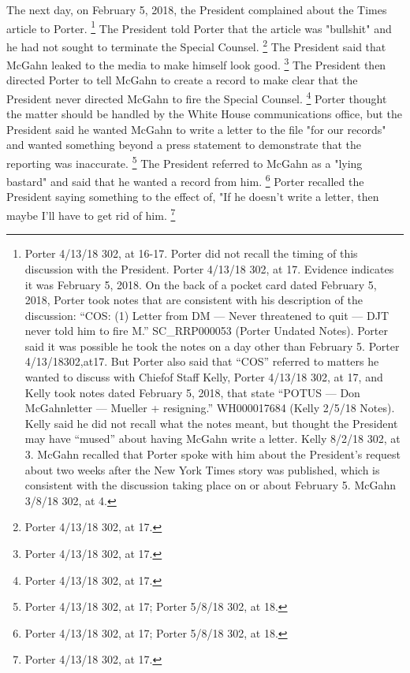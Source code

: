 {The next day, on February 5, 2018, the President complained about the Times article to Porter.%
\footnote{Porter 4/13/18 302, at 16-17.
Porter did not recall the timing of this discussion with the President.
Porter 4/13/18 302, at 17.
Evidence indicates it was February 5, 2018.
On the back of a pocket card dated February 5, 2018, Porter took notes that are consistent with his description of the discussion: “COS: (1) Letter from DM — Never threatened to quit — DJT never told him to fire M.”
SC\_RRP000053 (Porter Undated Notes).
Porter said it was possible he took the notes on a day other than February 5.
Porter 4/13/18302,at17.
But Porter also said that “COS” referred to matters he wanted to discuss with Chiefof Staff Kelly, Porter 4/13/18 302, at 17, and Kelly took notes dated February 5, 2018, that state “POTUS — Don McGahnletter — Mueller + resigning.”
WH000017684 (Kelly 2/5/18 Notes).
Kelly said he did not recall what the notes meant, but thought the President may have “mused” about having McGahn write a letter.
Kelly 8/2/18 302, at 3.
McGahn recalled that Porter spoke with him about the President’s request about two weeks after the New York Times story was published, which is consistent with the discussion taking place on or about February 5.
McGahn 3/8/18 302, at 4.}
The President told Porter that the article was "bullshit" and he had not sought to terminate the Special Counsel.%
\footnote{Porter 4/13/18 302, at 17.}
The President said that McGahn leaked to the media to make himself look good.%
\footnote{Porter 4/13/18 302, at 17.}
The President then directed Porter to tell McGahn to create a record to make clear that the President never directed McGahn to fire the Special Counsel.%
\footnote{Porter 4/13/18 302, at 17.}
Porter thought the matter should be handled by the White House communications office, but the President said he wanted McGahn to write a letter to the file "for our records" and wanted something beyond a press statement to demonstrate that the reporting was inaccurate.%
\footnote{Porter 4/13/18 302, at 17;
Porter 5/8/18 302, at 18.}
The President referred to McGahn as a "lying bastard" and said that he wanted a record from him.%
\footnote{Porter 4/13/18 302, at 17;
Porter 5/8/18 302, at 18.}
Porter recalled the President saying something to the effect of, "If he doesn't write a letter, then maybe I'll have to get rid of him.%
\footnote{Porter 4/13/18 302, at 17.}

}
